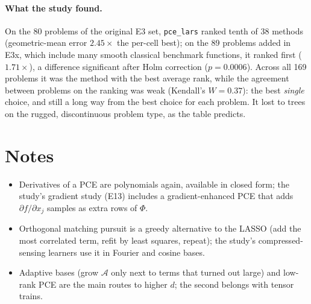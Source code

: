 \paragraph{What the study found.} On the 80 problems of the original E3 set, \texttt{pce\_lars} ranked tenth of 38
methods (geometric-mean error $2.45\times$ the per-cell best); on the 89 problems added in E3x, which include many
smooth classical benchmark functions, it ranked first ($1.71\times$), a difference significant after Holm correction
($p = 0.0006$). Across all 169 problems it was the method with the best average rank, while the agreement between
problems on the ranking was weak (Kendall's $W = 0.37$): the best \emph{single} choice, and still a long way from the
best choice for each problem. It lost to trees on the rugged, discontinuous problem type, as the table predicts.

\section*{Notes}
\begin{itemize}[leftmargin=*,nosep]
  \item Derivatives of a PCE are polynomials again, available in closed form; the study's gradient study (E13)
        includes a gradient-enhanced PCE that adds $\partial f/\partial x_j$ samples as extra rows of $\Phi$.
  \item Orthogonal matching pursuit is a greedy alternative to the LASSO (add the most correlated term, refit by least
        squares, repeat); the study's compressed-sensing learners use it in Fourier and cosine bases.
  \item Adaptive bases (grow $\mathcal{A}$ only next to terms that turned out large) and low-rank PCE are the main
        routes to higher $d$; the second belongs with tensor trains.
\end{itemize}

